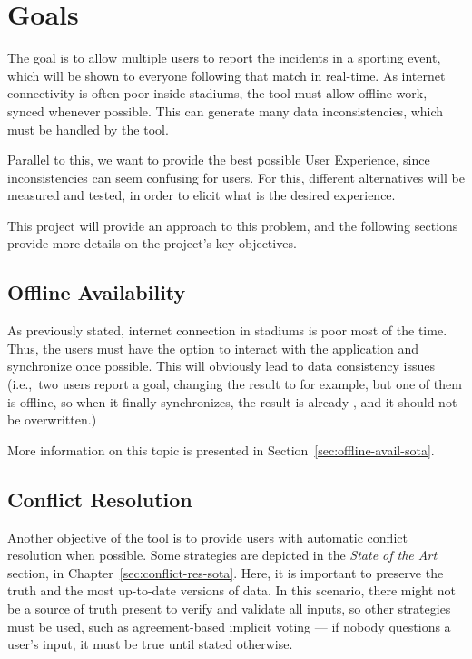 \section{Goals}
The goal is to allow multiple users to report the incidents in a sporting event, which will be shown to everyone following that match in real-time. As internet connectivity is often poor inside stadiums, the tool must allow offline work, synced whenever possible. This can generate many data inconsistencies, which must be handled by the tool.

Parallel to this, we want to provide the best possible User Experience, since inconsistencies can seem confusing for users. For this, different alternatives will be measured and tested, in order to elicit what is the desired experience. 

This project will provide an approach to this problem, and the following sections provide more details on the project's key objectives.

\subsection*{Offline Availability} \label{sec:offline-avail-intro}

As previously stated, internet connection in stadiums is poor most of the time. Thus, the users must have the option to interact with the application and synchronize once possible. This will obviously lead to data consistency issues (i.e.,\ two users report a goal, changing the result to  for example, but one of them is offline, so when it finally synchronizes, the result is already , and it should not be overwritten.)

More information on this topic is presented in Section~\ref{sec:offline-avail-sota}.

\subsection*{Conflict Resolution} \label{sec:conflict-res-intro}

Another objective of the tool is to provide users with automatic conflict resolution when possible. Some strategies are depicted in the \textit{State of the Art} section, in Chapter~\ref{sec:conflict-res-sota}. Here, it is important to preserve the truth and the most up-to-date versions of data. In this scenario, there might not be a source of truth present to verify and validate all inputs, so other strategies must be used, such as agreement-based implicit voting --- if nobody questions a user's input, it must be true until stated otherwise.

